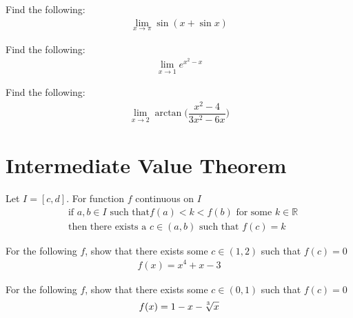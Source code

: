 \begin{exercise}
Find the following:
\begin{align*}
    \lim_{x \longrightarrow \pi} \sin (x + \sin x)
\end{align*}
\end{exercise}

\begin{exercise}
Find the following:
\begin{align*}
    \lim_{x \longrightarrow 1} e^{x^{2}-x}
\end{align*}
\end{exercise}

\begin{exercise}
Find the following:
\begin{align*}
    \lim_{x \longrightarrow 2} \arctan \Big( \dfrac{x^{2}-4}{3x^{2}-6x} \Big)
\end{align*}
\end{exercise}

\newpage
\section{Intermediate Value Theorem}

\begin{theorem}
Let $I = [c, d]$. For function $f$ continuous on $I$
\begin{align*}
    &\text{if} \hspace{4pt} a, b \in I \hspace{4pt} \text{such that} f(a)<k<f(b) \hspace{4pt} \text{for some} \hspace{4pt} k \in \mathbb{R}\\[2ex]
    &\text{then there exists a} \hspace{4pt} c \in (a, b) \hspace{4pt} \text{such that} \hspace{4pt} f(c) = k 
\end{align*}
\end{theorem}

\begin{exercise}
For the following $f$, show that there exists some $c \in (1, 2)$ such that $f(c)=0$
\begin{align*}
    f(x) = x^{4} + x - 3
\end{align*}
\end{exercise}

\begin{exercise}
For the following $f$, show that there exists some $c \in (0, 1)$ such that $f(c)=0$
\begin{align*}
    f(x) = 1 - x - \sqrt[\leftroot{2}\uproot{2}3]{x}
\end{align*}
\end{exercise}


